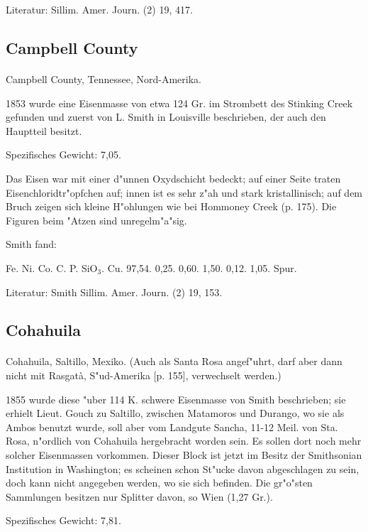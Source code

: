 \documentclass[a4paper, 11pt, oneside]{article}
\begin{document}
Literatur: Sillim. Amer. Journ. (2) 19, 417.

\subsection{Campbell County}
\normalsize
\paragraph{}
Campbell County, Tennessee, Nord-Amerika.

1853 wurde eine Eisenmasse von etwa 124 Gr. im Strombett des Stinking Creek gefunden und zuerst von L. Smith in Louisville beschrieben, der auch den Hauptteil besitzt.

Spezifisches Gewicht: 7,05.

Das Eisen war mit einer d"unnen Oxydschicht bedeckt; auf einer Seite traten Eisenchloridtr"opfchen auf; innen ist es sehr z"ah und stark kristallinisch; auf dem Bruch zeigen sich kleine H"ohlungen wie bei Hommoney Creek (p. 175). Die Figuren beim "Atzen sind unregelm"a"sig.

Smith fand:

Fe. Ni. Co. C. P. SiO$_{3}$. Cu.  
97,54. 0,25. 0,60. 1,50. 0,12. 1,05. Spur.

Literatur: Smith Sillim. Amer. Journ. (2) 19, 153.

\subsection{Cohahuila}
\normalsize
\paragraph{}
Cohahuila, Saltillo, Mexiko. (Auch als Santa Rosa angef"uhrt, darf aber dann nicht mit Rasgatà, S"ud-Amerika [p. 155], verwechselt werden.)

1855 wurde diese "uber 114 K. schwere Eisenmasse von Smith beschrieben; sie erhielt Lieut. Gouch zu Saltillo, zwischen Matamoros und Durango, wo sie als Ambos benutzt wurde, soll aber vom Landgute Sancha, 11-12 Meil. von Sta. Rosa, n"ordlich von Cohahuila hergebracht worden sein. Es sollen dort noch mehr solcher Eisenmassen vorkommen. Dieser Block ist jetzt im Besitz der Smithsonian Institution in Washington; es scheinen schon St"ucke davon abgeschlagen zu sein, doch kann nicht angegeben werden, wo sie sich befinden. Die gr"o"sten Sammlungen besitzen nur Splitter davon, so Wien (1,27 Gr.).

Spezifisches Gewicht: 7,81.
\end{document}
